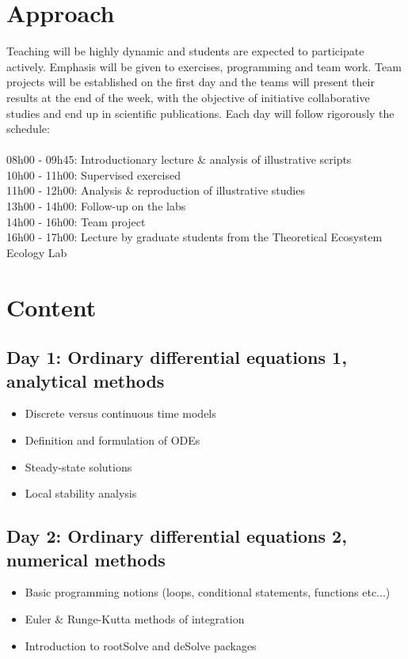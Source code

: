 \documentclass[11]{article}
\begin{document}
	\section*{Approach}
Teaching will be highly dynamic and students are expected to participate actively. Emphasis will be given to exercises, programming and team work. Team projects will be established on the first day and the teams will present their results at the end of the week, with the objective of initiative collaborative studies and end up in scientific publications. Each day will follow rigorously the schedule:\\
\\
08h00 - 09h45: Introductionary lecture \& analysis of illustrative scripts\\
10h00 - 11h00: Supervised exercised\\
11h00 - 12h00: Analysis \& reproduction of illustrative studies\\
13h00 - 14h00: Follow-up on the labs\\
14h00 - 16h00: Team project\\
16h00 - 17h00: Lecture by graduate students from the Theoretical Ecosystem Ecology Lab

	\section*{Content}
	\subsection*{Day 1: Ordinary differential equations 1, analytical methods}
	\begin{itemize}
		\item Discrete versus continuous time models
		\item Definition and formulation of ODEs
		\item Steady-state solutions
		\item Local stability analysis
	\end{itemize}

	\subsection*{Day 2: Ordinary differential equations 2, numerical methods}
	\begin{itemize}
		\item Basic programming notions (loops, conditional statements, functions etc...)
		\item Euler \& Runge-Kutta methods of integration
		\item Introduction to rootSolve and deSolve packages
	\end{itemize}
\end{document}
